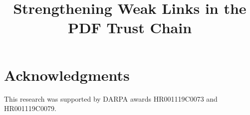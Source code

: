 \documentclass[conference,10pt]{IEEEtran}
\begin{document}
\date{}

\title{Strengthening Weak Links in the PDF Trust Chain}

\author{
     \and
}

\maketitle
\thispagestyle{plain} %



\begin{comment}
CONVENTION:
 - using this lstlisting[style=meta] environment to capture
   text in outline form that has not been fleshed out / turned into prose.

META NOTES:  
- aim for 12 pages (in 10pt) (LangSec specifies no limit)

TERMS (to actually use, and define when needed):
- ``complies with standard'', ``compatible with standard''
- Pre-DOM
- XRef (capitalized thus)
- Trust Chain (no quotes) [remove upper case?]
- parser differential
\end{comment}

















\section*{Acknowledgments}

This research was supported by DARPA awards HR001119C0073 and
HR001119C0079.





\appendix


\end{document}
